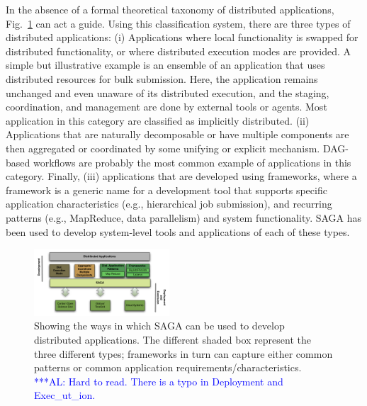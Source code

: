 \documentclass[conference,final]{IEEEtran}
\newcommand{\alnote}[1]{ {\textcolor{blue} { ***AL: #1 }}}
\newcommand{\alnote}[1]{}
\begin{document}
In the absence of a formal theoretical taxonomy of distributed
applications, Fig.~\ref{Fig:sagaapps} can act a guide.  Using this
classification system, there are three types of distributed
applications: (i) Applications where local functionality is swapped
for distributed functionality, or where distributed execution modes
are provided.  A simple but illustrative example is an ensemble of an
application that uses distributed resources for bulk submission. Here,
the application remains unchanged and even unaware of its distributed
execution, and the staging, coordination, and management are done by
external tools or agents. Most application in this category are
classified as implicitly distributed.  (ii) Applications that are
naturally decomposable or have multiple components are then aggregated
or coordinated by some unifying or explicit mechanism.  DAG-based
workflows are probably the most common example of applications in this
category.
Finally, (iii) applications that are developed using frameworks, where
a framework is a generic name for a development tool that supports
specific application characteristics (e.g., hierarchical job
submission), and recurring patterns (e.g., MapReduce, data
parallelism) and system functionality.  SAGA has been used to develop
system-level tools and applications of each of these types.

\begin{figure}[!ht]
  \begin{center}
    \includegraphics[width=0.45\textwidth]{distributed_applications_saga_figure.pdf}
  \end{center}
  \caption{\small Showing the ways in which
      SAGA can be used to develop distributed applications.
      The different shaded box represent the three different types;
      frameworks in turn can capture either common patterns or common
      application requirements/characteristics. \label{Fig:sagaapps}
      \alnote{Hard to read. There is a typo in Deployment and Exec_ut_ion.}}
\end{figure}
\end{document}
